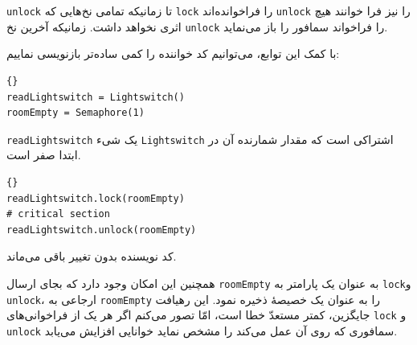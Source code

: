 \documentclass{book}
\begin{document}
{\tt unlock} 
    تا زمانیکه تمامی نخ‌هایی که {\tt lock} را فراخوانده‌اند {\tt unlock} را نیز فرا خوانند هیچ اثری نخواهد داشت. زمانیکه آخرین نخ {\tt unlock} را 
    فراخواند سمافور را باز می‌نماید. 

\newpage
    با کمک این توابع، می‌توانیم کد خواننده را کمی ساده‌تر بازنویسی نماییم: 

\begin{latin}
\begin{lstlisting}[title=\rl{مقدار دهی اولیه خوانندگان-نویسندگان}]{}
readLightswitch = Lightswitch()
roomEmpty = Semaphore(1)
\end{lstlisting}
\end{latin}

    {\tt readLightswitch} 
    یک شیء  {\tt Lightswitch} اشتراکی است که مقدار شمارنده آن در ابتدا صفر است. 


\begin{latin}
\begin{lstlisting}[title=\rl{راه حل خوانندگان-نویسندگان (خواننده)}]{}
readLightswitch.lock(roomEmpty)
# critical section
readLightswitch.unlock(roomEmpty)
\end{lstlisting}
\end{latin}

    کد نویسنده بدون تغییر باقی می‌ماند. 

    همچنین این امکان وجود دارد که بجای ارسال {\tt roomEmpty} به عنوان یک پارامتر به {\tt lock}و  {\tt unlock}، 
    ارجاعی  به {\tt roomEmpty} را به عنوان یک خصیصهٔ‌  ذخیره نمود. این رهیافت جایگزین، کمتر مستعدّ خطا است،
    امّا تصور می‌کنم اگر هر یک از فراخوانی‌های {\tt lock} و  {\tt unlock} سمافوری که روی آن عمل می‌کند را مشخص نماید خوانایی افزایش می‌یابد. 
    
\end{document}
